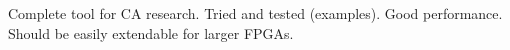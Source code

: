\TODO
Complete tool for CA research.
Tried and tested (examples).
Good performance.
Should be easily extendable for larger FPGAs.
